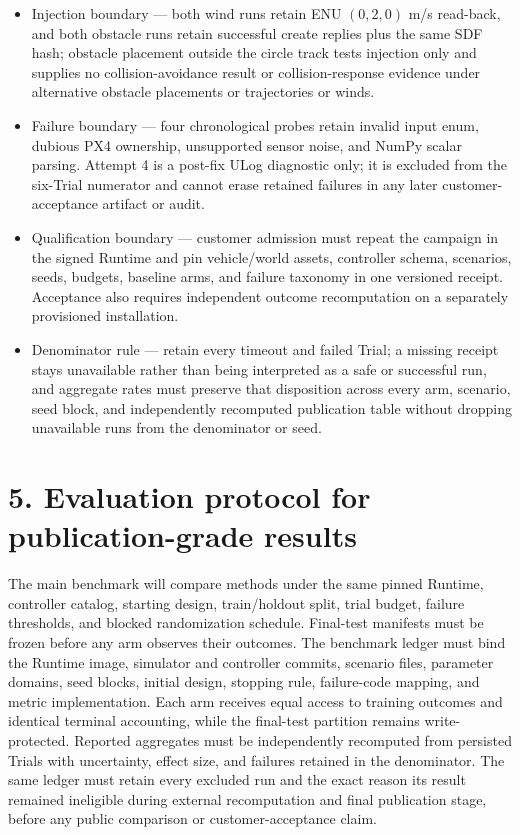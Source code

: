 \begin{itemize}
\item
  Injection boundary --- both wind runs retain ENU $(0,2,0)$ m/s
  read-back, and both obstacle runs retain successful create replies plus
  the same SDF hash; obstacle placement outside the circle track tests
  injection only and supplies no collision-avoidance result or
  collision-response evidence under alternative obstacle placements or
  trajectories or winds.
\item
  Failure boundary --- four chronological probes retain invalid input
  enum, dubious PX4 ownership, unsupported sensor noise, and NumPy scalar
  parsing. Attempt 4 is a post-fix ULog diagnostic only; it is excluded
  from the six-Trial numerator and cannot erase retained failures in any
  later customer-acceptance artifact or audit.
\item
  Qualification boundary --- customer admission must repeat the campaign
  in the signed Runtime and pin vehicle/world assets, controller schema,
  scenarios, seeds, budgets, baseline arms, and failure taxonomy in one
  versioned receipt. Acceptance also requires independent outcome
  recomputation on a separately provisioned installation.
\item
  Denominator rule --- retain every timeout and failed Trial; a missing
  receipt stays unavailable rather than being interpreted as a safe or
  successful run, and aggregate rates must preserve that disposition
  across every arm, scenario, seed block, and independently recomputed
  publication table without dropping unavailable runs from the
  denominator or seed.
\end{itemize}

\section{\texorpdfstring{\textbf{5. Evaluation protocol for
publication-grade
results}}{5. Evaluation protocol for publication-grade results}}\label{evaluation-protocol-for-publication-grade-results}

The main benchmark will compare methods under the same pinned Runtime,
controller catalog, starting design, train/holdout split, trial budget,
failure thresholds, and blocked randomization schedule. Final-test
manifests must be frozen before any arm observes their outcomes. The
benchmark ledger must bind the Runtime image, simulator and controller
commits, scenario files, parameter domains, seed blocks, initial design,
stopping rule, failure-code mapping, and metric implementation. Each arm
receives equal access to training outcomes and identical terminal
accounting, while the final-test partition remains write-protected.
Reported aggregates must be independently recomputed from persisted
Trials with uncertainty, effect size, and failures retained in the
denominator. The same ledger must retain every excluded run and the
exact reason its result remained ineligible during external
recomputation and final publication stage, before any public comparison
or customer-acceptance claim.

